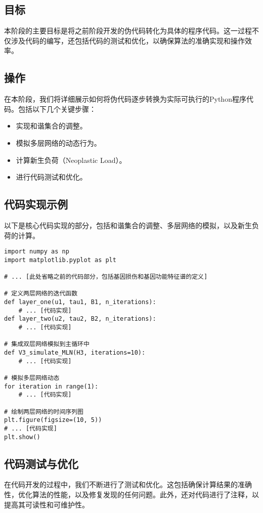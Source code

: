\documentclass{article}
\begin{document}
\subsection{目标}
本阶段的主要目标是将之前阶段开发的伪代码转化为具体的程序代码。这一过程不仅涉及代码的编写，还包括代码的测试和优化，以确保算法的准确实现和操作效率。

\subsection{操作}
在本阶段，我们将详细展示如何将伪代码逐步转换为实际可执行的Python程序代码。包括以下几个关键步骤：
\begin{itemize}
    \item 实现和谐集合的调整。
    \item 模拟多层网络的动态行为。
    \item 计算新生负荷（Neoplastic Load）。
    \item 进行代码测试和优化。
\end{itemize}

\subsection{代码实现示例}
以下是核心代码实现的部分，包括和谐集合的调整、多层网络的模拟，以及新生负荷的计算。

\begin{verbatim}
import numpy as np
import matplotlib.pyplot as plt

# ... [此处省略之前的代码部分，包括基因损伤和基因功能特征谱的定义]

# 定义两层网络的迭代函数
def layer_one(u1, tau1, B1, n_iterations):
    # ... [代码实现]
def layer_two(u2, tau2, B2, n_iterations):
    # ... [代码实现]

# 集成双层网络模拟到主循环中
def V3_simulate_MLN(H3, iterations=10):
    # ... [代码实现]

# 模拟多层网络动态
for iteration in range(1):
    # ... [代码实现]

# 绘制两层网络的时间序列图
plt.figure(figsize=(10, 5))
# ... [代码实现]
plt.show()
\end{verbatim}

\subsection{代码测试与优化}
在代码开发的过程中，我们不断进行了测试和优化。这包括确保计算结果的准确性，优化算法的性能，以及修复发现的任何问题。此外，还对代码进行了注释，以提高其可读性和可维护性。
\end{document}
